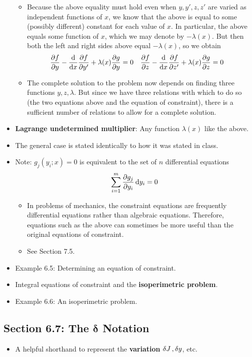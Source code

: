 \documentclass[../notes.tex]{subfiles}
\begin{document}
\begin{itemize}
\begin{itemize}
\begin{equation*}
        \end{equation*}
        \item Because the above equality must hold even when $y,y',z,z'$ are varied as independent functions of $x$, we know that the above is equal to some (possibly different) constant for each value of $x$. In particular, the above equals some function of $x$, which we may denote by $-\lambda(x)$. But then both the left and right sides above equal $-\lambda(x)$, so we obtain
        \begin{align*}
            \pdv{f}{y}-\dv{x}\pdv{f}{y'}+\lambda(x)\pdv{g}{y} &= 0&
            \pdv{f}{z}-\dv{x}\pdv{f}{z'}+\lambda(x)\pdv{g}{z} &= 0
        \end{align*}
        \item The complete solution to the problem now depends on finding three functions $y,z,\lambda$. But since we have three relations with which to do so (the two equations above and the equation of constraint), there is a sufficient number of relations to allow for a complete solution.
    \end{itemize}
    \item \textbf{Lagrange undetermined multiplier}: Any function $\lambda(x)$ like the above.
    \item The general case is stated identically to how it was stated in class.
    \item Note: $g_j(y_i;x)=0$ is equivalent to the set of $n$ differential equations
    \begin{equation*}
        \sum_{i=1}^m\pdv{g_j}{y_i}\dd{y_i} = 0
    \end{equation*}
    \begin{itemize}
        \item In problems of mechanics, the constraint equations are frequently differential equations rather than algebraic equations. Therefore, equations such as the above can sometimes be more useful than the original equations of constraint.
        \item See Section 7.5.
    \end{itemize}
    \item Example 6.5: Determining an equation of constraint.
    \item Integral equations of constraint and the \textbf{isoperimetric problem}.
    \item Example 6.6: An isoperimetric problem.
\end{itemize}


\subsection*{Section 6.7: The $\bm{\delta}$ Notation}
\begin{itemize}
    \item A helpful shorthand to represent the \textbf{variation} $\var{J},\var{y}$, etc.
\end{itemize}
\end{document}
